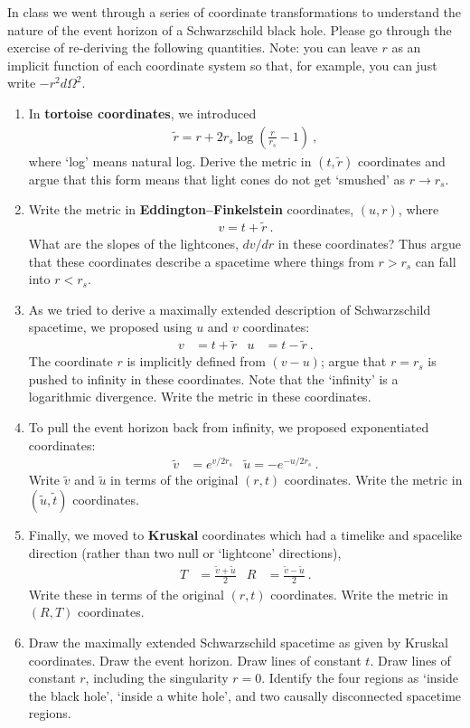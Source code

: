 \documentclass[12pt]{article}
\numberwithin{equation}{section}    %
\renewcommand{\tilde}{\widetilde}   %
\begin{document}
In class we went through a series of coordinate transformations to understand the nature of the event horizon of a Schwarzschild black hole. Please go through the exercise of re-deriving the following quantities. Note: you can leave $r$ as an implicit function of each coordinate system so that, for example, you can just write $-r^2d\Omega^2$.
\begin{enumerate}
	\item In \textbf{tortoise coordinates}, we introduced 
	\begin{align}
		\tilde r = r + 2r_s \log\left(\frac{r}{r_s}-1\right)\ ,
	\end{align}
	where `log' means natural log. Derive the metric in $(t,\tilde r)$ coordinates and argue that this form means that light cones do not get `smushed' as $r\to r_s$. 
	\item Write the metric in \textbf{Eddington--Finkelstein} coordinates, $(u,r)$, where 
	\begin{align}
		v = t + \tilde r \ .
	\end{align}
	What are the slopes of the lightcones, $dv/dr$ in these coordinates? Thus argue that these coordinates describe a spacetime where things from $r>r_s$ can fall into $r<r_s$. 
	\item As we tried to derive a maximally extended description of Schwarzschild spacetime, we proposed using $u$ and $v$ coordinates:
	\begin{align}
		v &= t + \tilde r   & u & = t- \tilde r \ .
	\end{align}
	The coordinate $r$ is implicitly defined from $(v-u)$; argue that $r=r_s$ is pushed to infinity in these coordinates. Note that the `infinity' is a logarithmic divergence. Write the metric in these coordinates.
	\item To pull the event horizon back from infinity, we proposed exponentiated coordinates:
	\begin{align}
	\tilde v &= e^{v/2r_s}	
	& \tilde u = - e^{-u/2r_s} \ .
	\end{align}
	Write $\tilde v$ and $\tilde u$ in terms of the original $(r,t)$ coordinates. Write the metric in $(\tilde u, \tilde t)$ coordinates.
	\item Finally, we moved to \textbf{Kruskal} coordinates which had a timelike and spacelike direction (rather than two null or `lightcone' directions),
	\begin{align}
		T &= \frac{\tilde v + \tilde u}{2}
		&
		R &= \frac{\tilde v - \tilde u}{2} \ .
	\end{align}
	Write these in terms of the original $(r,t)$ coordinates. Write the metric in $(R,T)$ coordinates. 
	\item Draw the maximally extended Schwarzschild spacetime as given by Kruskal coordinates. Draw the event horizon.   Draw lines of constant $t$. Draw lines of constant $r$, including the singularity $r=0$. Identify the four regions as `inside the black hole', `inside a white hole', and two causally disconnected spacetime regions. 
\end{enumerate}
\end{document}
